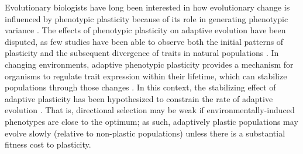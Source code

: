 \documentclass[utf8]{frontiersSCNS} %
\begin{document}
\begin{raggedbottom}
Evolutionary biologists have long been interested in how evolutionary change is influenced by phenotypic plasticity because of its role in generating phenotypic variance \citep{gibert_phenotypic_2019}.
The effects of phenotypic plasticity on adaptive evolution have been disputed, as few studies have been able to observe both the initial patterns of plasticity and the subsequent divergence of traits in natural populations \citep{ghalambor_adaptive_2007,wund_assessing_2012,forsman_rethinking_2015,ghalambor_non-adaptive_2015,hendry_key_2016}.
In changing environments, adaptive phenotypic plasticity provides a mechanism for organisms to regulate trait expression within their lifetime, which can stabilize populations through those changes \citep{gibert_phenotypic_2019}.
In this context, the stabilizing effect of adaptive plasticity has been hypothesized to constrain the rate of adaptive evolution \citep{gupta_study_1982,ancel_undermining_2000,huey_behavioral_2003,price_role_2003,paenke_influence_2007}.
That is, directional selection may be weak if environmentally-induced phenotypes are close to the optimum; as such, adaptively plastic populations may evolve slowly (relative to non-plastic populations) unless there is a substantial fitness cost to plasticity.


\end{raggedbottom}
\end{document}

